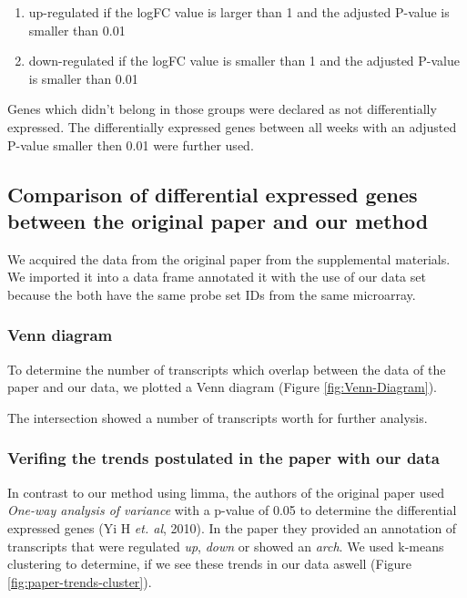 \documentclass[
]{article}
\providecommand{\tightlist}{%
  \setlength{\itemsep}{0pt}\setlength{\parskip}{0pt}}
\begin{document}
\begin{enumerate}
\def\labelenumi{\arabic{enumi}.}
\tightlist
\item
  up-regulated if the logFC value is larger than 1 and the adjusted P-value is smaller than 0.01
\item
  down-regulated if the logFC value is smaller than 1 and the adjusted P-value is smaller than 0.01
\end{enumerate}

Genes which didn't belong in those groups were declared as not differentially expressed. The differentially expressed genes between all weeks with an adjusted P-value smaller then 0.01 were further used.

\hypertarget{paper-comp}{%
\subsection{Comparison of differential expressed genes between the original paper and our method}\label{paper-comp}}

We acquired the data from the original paper from the supplemental materials. We imported it into a data frame annotated it with the use of our data set because the both have the same probe set IDs from the same microarray.

\hypertarget{venn-diagram}{%
\subsubsection{Venn diagram}\label{venn-diagram}}

To determine the number of transcripts which overlap between the data of the paper and our data, we plotted a Venn diagram (Figure \ref{fig:Venn-Diagram}).

The intersection showed a number of transcripts worth for further analysis.

\hypertarget{verifing-the-trends-postulated-in-the-paper-with-our-data}{%
\subsubsection{Verifing the trends postulated in the paper with our data}\label{verifing-the-trends-postulated-in-the-paper-with-our-data}}

In contrast to our method using limma, the authors of the original paper used \emph{One-way analysis of variance} with a p-value of 0.05 to determine the differential expressed genes (Yi H \emph{et. al}, 2010). In the paper they provided an annotation of transcripts that were regulated \emph{up}, \emph{down} or showed an \emph{arch}. We used k-means clustering to determine, if we see these trends in our data aswell (Figure \ref{fig:paper-trends-cluster}).
\end{document}
